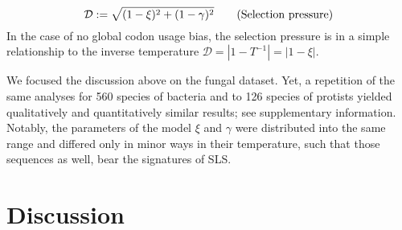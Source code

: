 \documentclass[a4paper,10pt]{paper}%
\begin{document}
%
% 
\begin{equation}
\mathcal D:= \sqrt{(1-\xi)^2 + (1-\gamma)^2} \tag{\textrm{Selection pressure}}
\end{equation}
%
%  
In the case  of no global codon usage bias, the selection pressure  is in a simple relationship to the inverse temperature $\mathcal D = | 1- T^{-1}|= | 1- \xi|$.
\par
We focused the discussion above on the fungal dataset. Yet, a repetition of the same analyses   for  560 species of bacteria and to 126 species of protists  yielded qualitatively and quantitatively similar results; see supplementary information.    Notably, the parameters of the model $\xi$ and $\gamma$ were distributed into the same range and differed only in minor ways in their temperature, such that those sequences as well, bear the signatures of SLS.



\section{Discussion}
\end{document}

